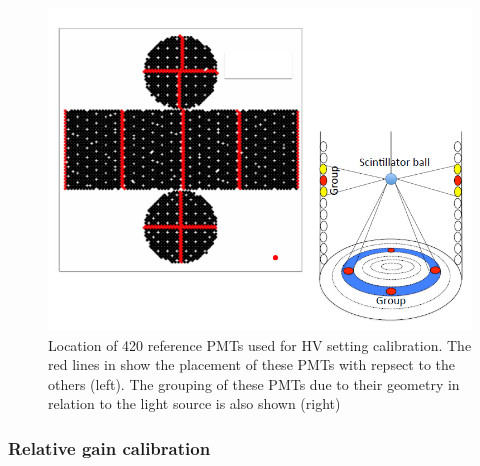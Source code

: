 \begin{figure}
    \includegraphics[width=\textwidth]{Figures/hvcalib.png}
\caption{Location of 420 reference PMTs used for HV setting calibration. The red lines in show the placement of these PMTs with repsect to the others (left). The grouping of these PMTs due to their geometry in relation to the light source is also shown (right) }
    \label{fig:hvcalib}
\end{figure}




\subsubsection{Relative gain calibration}

